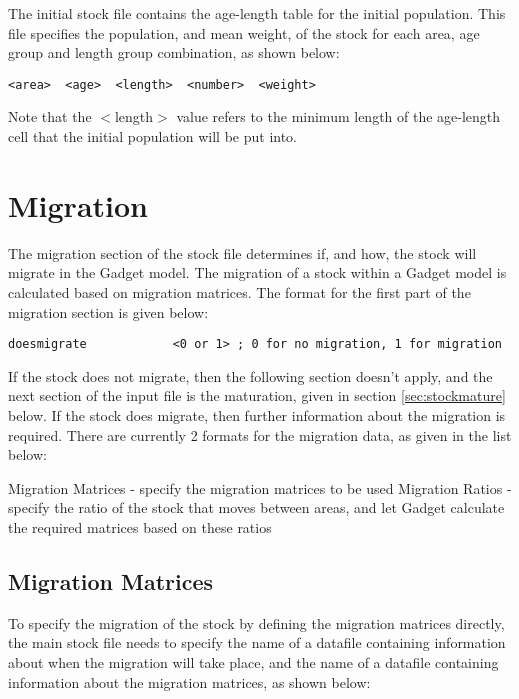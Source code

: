 \documentclass[]{book}
\begin{document}
The initial stock file contains the age-length table for the initial
population. This file specifies the population, and mean weight, of the
stock for each area, age group and length group combination, as shown
below:

\begin{verbatim}
<area>  <age>  <length>  <number>  <weight>
\end{verbatim}

Note that the \(<\)length\(>\) value refers to the minimum length of the
age-length cell that the initial population will be put into.

\hypertarget{sec:stockmigrate}{%
\section{Migration}\label{sec:stockmigrate}}

The migration section of the stock file determines if, and how, the
stock will migrate in the Gadget model. The migration of a stock within
a Gadget model is calculated based on migration matrices. The format for
the first part of the migration section is given below:

\begin{verbatim}
doesmigrate            <0 or 1> ; 0 for no migration, 1 for migration
\end{verbatim}

If the stock does not migrate, then the following section doesn't apply,
and the next section of the input file is the maturation, given in
section \ref{sec:stockmature} below. If the stock does migrate, then
further information about the migration is required. There are currently
2 formats for the migration data, as given in the list below:

Migration Matrices - specify the migration matrices to be used Migration
Ratios - specify the ratio of the stock that moves between areas, and
let Gadget calculate the required matrices based on these ratios

\hypertarget{migration-matrices}{%
\subsection{Migration Matrices}\label{migration-matrices}}

To specify the migration of the stock by defining the migration matrices
directly, the main stock file needs to specify the name of a datafile
containing information about when the migration will take place, and the
name of a datafile containing information about the migration matrices,
as shown below:
\end{document}
